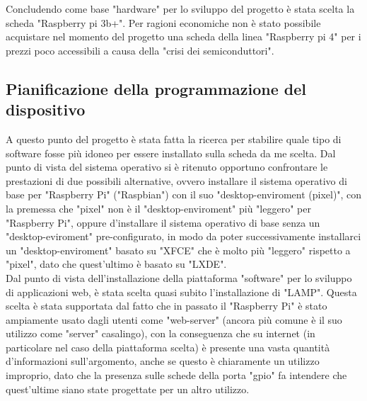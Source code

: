 Concludendo come base "hardware" per lo sviluppo del progetto è stata scelta la scheda "Raspberry pi 3b+". Per ragioni economiche non è stato possibile acquistare nel momento del progetto una scheda della linea "Raspberry pi 4" per i prezzi poco accessibili a causa della "crisi dei semiconduttori".

\subsection{Pianificazione della programmazione del dispositivo}
\raggedright
A questo punto del progetto è stata fatta la ricerca per stabilire quale tipo di software fosse più idoneo per essere installato sulla scheda da me scelta. Dal punto di vista del sistema operativo si è ritenuto opportuno confrontare le prestazioni di due possibili alternative, ovvero installare il sistema operativo di base per "Raspberry Pi" ("Raspbian") con il suo "desktop-enviroment (pixel)", con la premessa che "pixel" non è il "desktop-enviroment" più "leggero" per "Raspberry Pi", oppure d'installare il sistema operativo di base senza un "desktop-eviroment" pre-configurato, in modo da poter successivamente installarci un "desktop-enviroment" basato su "XFCE" che è molto più "leggero" rispetto a "pixel", dato che quest'ultimo è basato su "LXDE".\\
Dal punto di vista dell'installazione della piattaforma "software" per lo sviluppo di applicazioni web, è stata scelta quasi subito l'installazione di "LAMP". Questa scelta è stata supportata dal fatto che in passato il "Raspberry Pi" è stato ampiamente usato dagli utenti come "web-server" (ancora più comune è il suo utilizzo come "server" casalingo), con la conseguenza che su internet (in particolare nel caso della piattaforma scelta) è presente una vasta quantità d'informazioni sull'argomento,  anche se questo è chiaramente un utilizzo improprio, dato che la presenza sulle schede della porta "gpio" fa intendere che quest'ultime siano state progettate per un altro utilizzo. 

